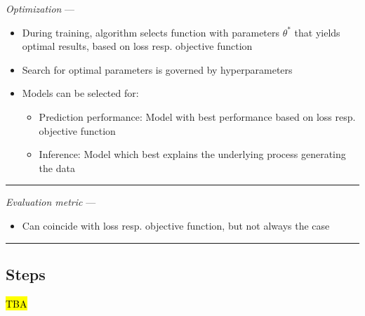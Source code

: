\emph{Optimization} --- 
\begin{itemize}
    \item During training, algorithm selects function with parameters $\theta^*$ that yields optimal results, based on loss resp. objective function
    \item Search for optimal parameters is governed by hyperparameters
    \item Models can be selected for:
    \begin{itemize}
        \item Prediction performance: Model with best performance based on loss resp. objective function
        \item Inference: Model which best explains the underlying process generating the data
    \end{itemize}
\end{itemize}

{\color{lightgray}\hrule height 0.001mm}

\emph{Evaluation metric} --- 
\begin{itemize}
    \item Can coincide with loss resp. objective function, but not always the case
\end{itemize}

{\color{black}\hrule height 0.001mm}

\subsection*{Steps}
\hl{TBA}